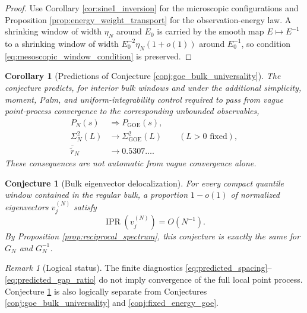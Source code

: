 \documentclass[11pt]{amsart}
\numberwithin{equation}{section}
\theoremstyle{plain}
\newtheorem{corollary}[theorem]{Corollary}
\newtheorem{conjecture}[theorem]{Conjecture}
\theoremstyle{definition}
\theoremstyle{remark}
\newtheorem{remark}[theorem]{Remark}
\newcommand{\IPR}{\operatorname{IPR}}
\newcommand{\GOE}{\mathrm{GOE}}
\begin{document}
\begin{proof}
Use Corollary \ref{cor:sine1_inversion} for the microscopic configurations and Proposition \ref{prop:energy_weight_transport} for the observation-energy law.  A shrinking window of width $\eta_N$ around $E_0$ is carried by the smooth map $E\mapsto E^{-1}$ to a shrinking window of width $E_0^{-2}\eta_N(1+o(1))$ around $E_0^{-1}$, so condition \eqref{eq:mesoscopic_window_condition} is preserved.
\end{proof}

\begin{corollary}[Predictions of Conjecture \ref{conj:goe_bulk_universality}]
\label{cor:goe_predictions}
The conjecture predicts, for interior bulk windows and under the additional simplicity, moment, Palm, and uniform-integrability control required to pass from vague point-process convergence to the corresponding unbounded observables,
\begin{align}
P_N(s)&\Longrightarrow P_{\GOE}(s),
\label{eq:predicted_spacing}\\
\Sigma_N^2(L)&\longrightarrow\Sigma_{\GOE}^2(L)
\qquad(L>0\text{ fixed}),
\label{eq:predicted_number_variance}\\
\overline{\widetilde r}_N&\longrightarrow0.5307\ldots.
\label{eq:predicted_gap_ratio}
\end{align}
These consequences are not automatic from vague convergence alone.
\end{corollary}

\begin{conjecture}[Bulk eigenvector delocalization]
\label{conj:bulk_delocalization}
For every compact quantile window contained in the regular bulk, a proportion $1-o(1)$ of normalized eigenvectors $v_j^{(N)}$ satisfy
\begin{equation}
\IPR\!\left(v_j^{(N)}\right)=O(N^{-1}).
\label{eq:ipr_conjecture}
\end{equation}
By Proposition \ref{prop:reciprocal_spectrum}, this conjecture is exactly the same for $G_N$ and $G_N^{-1}$.
\end{conjecture}

\begin{remark}[Logical status]
\label{rem:not_equivalent_diagnostics}
The finite diagnostics \eqref{eq:predicted_spacing}--\eqref{eq:predicted_gap_ratio} do not imply convergence of the full local point process.  Conjecture \ref{conj:bulk_delocalization} is also logically separate from Conjectures \ref{conj:goe_bulk_universality} and \ref{conj:fixed_energy_goe}.
\end{remark}
\end{document}

